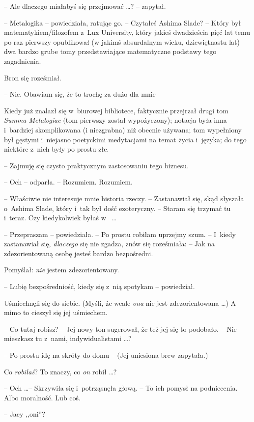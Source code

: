 \documentclass[oneside,polish,11pt,rmheadings]{mwbk}
\begin{document}
-- Ale dlaczego miałabyś się przejmować \ldots ? -- zapytał. 

-- Metalogika -- powiedziała, ratując go. -- Czytałeś Ashima Slade? -- Który był matematykiem/filozofem z~Lux University, który jakieś dwadzieścia pięć lat temu po raz pierwszy opublikował (w jakimś absurdalnym wieku, dziewiętnastu lat) dwa bardzo grube tomy przedstawiające matematyczne podstawy tego zagadnienia. 

Bron się roześmiał. 

-- Nie. Obawiam się, że to trochę za dużo dla mnie 

Kiedy już znalazł się w~biurowej bibliotece, faktycznie przejrzał drugi tom \textit{Summa Metalogiae }(tom pierwszy został wypożyczony); notacja była inna i~bardziej skomplikowana (i niezgrabna)  niż obecnie używana; tom wypełniony był gęstymi i~niejasno poetyckimi medytacjami na temat życia i~języka; do tego niektóre z~nich były po prostu złe. 

-- Zajmuję się czysto praktycznym zastosowaniu tego biznesu. 

-- Och -- odparła. -- Rozumiem. Rozumiem.  

-- Właściwie nie interesuje mnie historia rzeczy. -- Zastanawiał się, skąd słyszała o~Ashima Slade, który i~tak był dość ezoteryczny. -- Staram się trzymać tu i~teraz. Czy kiedykolwiek byłaś w~ \ldots  

-- Przepraszam -- powiedziała. -- Po prostu robiłam uprzejmy szum. -- I~kiedy zastanawiał się, \textit{dlaczego }się nie zgadza, znów się roześmiała: -- Jak na zdezorientowaną osobę jesteś bardzo bezpośredni. 

Pomyślał: \textit{nie }jestem zdezorientowany. 

-- Lubię bezpośredniość, kiedy się z~nią spotykam -- powiedział. 

Uśmiechnęli się do siebie. (Myśli, że wcale \textit{ona }nie jest zdezorientowana \ldots ) A mimo to cieszył się jej uśmiechem. 

-- Co tutaj robisz? -- Jej nowy ton sugerował, że też jej się to podobało. -- Nie mieszkasz tu z~nami, indywidualistami \ldots ? 

-- Po prostu idę na skróty do domu -- (Jej uniesiona brew zapytała.) 

Co \textit{robiłaś}? To znaczy, co \textit{on }robił \ldots ? 

-- Och \ldots  -- Skrzywiła się i~potrząsnęła głową. -- To ich pomysł na podniecenia. Albo moralność. Lub coś. 

-- Jacy ,,oni''? 
\end{document}
